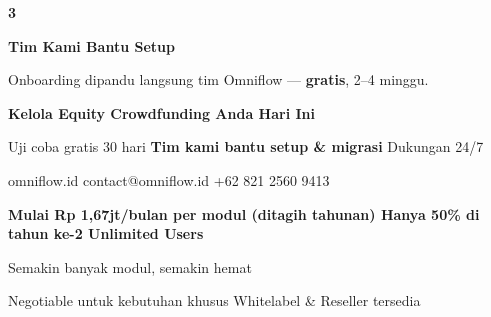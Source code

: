 \documentclass[a4paper]{article}
\begin{document}
\begin{center}
\begin{minipage}[t]{0.318\textwidth}
{\begin{minipage}[t][4.7cm][c]{\dimexpr\linewidth-2\fboxsep\relax}
            \begin{center}{\fontsize{22}{26}\selectfont\bfseries\color{BluePrimary} 3}\end{center}
            \vspace{2pt}
            \begin{center}
                {\fontsize{10}{13}\selectfont\bfseries\color{BlueDark} Tim Kami Bantu Setup}\par\vspace{3pt}
                {\fontsize{9}{12}\selectfont\color{TextDark} Onboarding dipandu langsung tim Omniflow --- \textbf{gratis}, 2--4 minggu.}
            \end{center}
        \end{minipage}}
\end{minipage}
\end{center}

\vspace{8pt}

{\setlength{\fboxsep}{10pt}\setlength{\fboxrule}{0pt}%
\noindent\colorbox{BluePrimary}{%
    \begin{minipage}{\dimexpr\textwidth-2\fboxsep\relax}
        \centering
        {\fontsize{13}{16}\selectfont\bfseries\color{White} Kelola Equity Crowdfunding Anda Hari Ini}\par\vspace{3pt}
        {\fontsize{9.5}{12}\selectfont\color{BlueMid} Uji coba gratis 30 hari \enspace\textbullet\enspace \textbf{Tim kami bantu setup \& migrasi} \enspace\textbullet\enspace Dukungan 24/7}\par\vspace{2pt}
        {\fontsize{9.5}{12}\selectfont\color{BlueLight} omniflow.id \enspace\textbullet\enspace contact@omniflow.id \enspace\textbullet\enspace +62 821 2560 9413}
    \end{minipage}}}


\vspace{6pt}

{\setlength{\fboxsep}{8pt}\setlength{\fboxrule}{0pt}%
\noindent\colorbox{BlueBg}{%
    \begin{minipage}{\dimexpr\textwidth-2\fboxsep\relax}
        \centering
        {\fontsize{9}{12}\selectfont\bfseries\color{BluePrimary}
        Mulai Rp 1,67jt/bulan per modul (ditagih tahunan) \enspace\textbullet\enspace Hanya 50\% di tahun ke-2 \enspace\textbullet\enspace Unlimited Users}\par\vspace{1pt}
        {\fontsize{8.5}{11}\selectfont\color{BlueDark}
        Semakin banyak modul, semakin hemat}\par\vspace{1pt}
        {\fontsize{8}{10}\selectfont\color{TextLight}
        Negotiable untuk kebutuhan khusus \enspace\textbullet\enspace Whitelabel \& Reseller tersedia}
    \end{minipage}}}

\restoregeometry
\pagestyle{empty}
\end{document}
